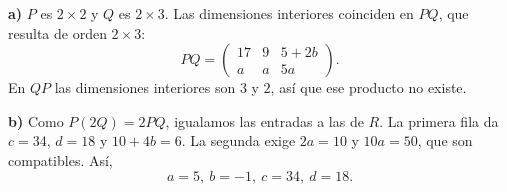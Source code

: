 \textbf{a)} $P$ es $2\times2$ y $Q$ es $2\times3$. Las dimensiones interiores coinciden en $PQ$, que resulta de orden $2\times3$:
\[
PQ=\begin{pmatrix}17&9&5+2b\\a&a&5a\end{pmatrix}.
\]
En $QP$ las dimensiones interiores son $3$ y $2$, así que ese producto no existe.

\textbf{b)} Como $P(2Q)=2PQ$, igualamos las entradas a las de $R$. La primera fila da $c=34$, $d=18$ y $10+4b=6$. La segunda exige $2a=10$ y $10a=50$, que son compatibles. Así,
\[\boxed{a=5,\ b=-1,\ c=34,\ d=18}.\]
